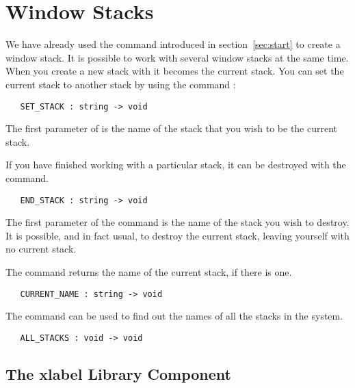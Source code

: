 \section{Window Stacks}

We have already used the
 command
introduced in section~\ref{sec:start} to create a window stack.
It is possible to work with several window stacks at the same time.
When you create a new stack with
it becomes the current stack.
You can set the current stack to another stack by using the
command :
\begin{boxed}\begin{verbatim}
   SET_STACK : string -> void
\end{verbatim}\end{boxed}
The first parameter of 
 is the name of
the stack that you wish to be the current stack.

If you have finished working with a particular stack,
it can be destroyed with the 
 command.
\begin{boxed}\begin{verbatim}
   END_STACK : string -> void
\end{verbatim}\end{boxed}
The first parameter of the 
 command is the name
of the stack you wish to destroy.
It is possible, and in fact usual, to destroy the current stack, 
leaving yourself with no current stack.

The command 
returns the name of the current stack, if there is one.
\begin{boxed}\begin{verbatim}
   CURRENT_NAME : string -> void
\end{verbatim}\end{boxed}
The  command
can be used to find out the names of all the stacks in the system.
\begin{boxed}\begin{verbatim}
   ALL_STACKS : void -> void
\end{verbatim}\end{boxed}

\subsection{The xlabel Library Component}


